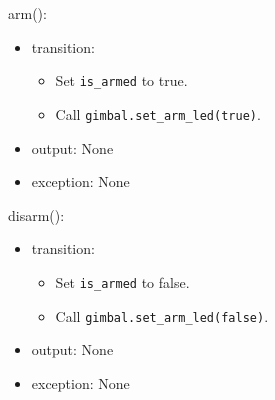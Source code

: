 \documentclass[12pt, titlepage]{article}
\begin{document}
\noindent arm():
\begin{itemize}
  \item transition:
        \begin{itemize}
          \item Set \texttt{is\_armed} to true.
          \item Call \texttt{gimbal.set\_arm\_led(true)}.
        \end{itemize}
  \item output: None
  \item exception: None
\end{itemize}

\noindent disarm():
\begin{itemize}
  \item transition:
        \begin{itemize}
          \item Set \texttt{is\_armed} to false.
          \item Call \texttt{gimbal.set\_arm\_led(false)}.
        \end{itemize}
  \item output: None
  \item exception: None
\end{itemize}
\end{document}
